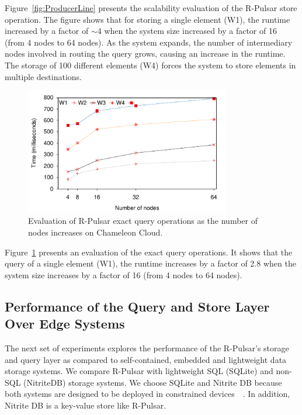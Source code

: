 Figure~\ref{fig:ProducerLine} presents the scalability evaluation of the R-Pulsar store operation. The figure shows that for storing a single element (W1), the runtime increased by a factor of $\sim$4 when the system size increased by a factor of 16 (from 4 nodes to 64 nodes). As the system expands, the number of intermediary nodes involved in routing the query grows, causing an increase in the runtime. The storage of 100 different elements (W4) forces the system to store elements in multiple destinations.

\begin{figure}[h!]
  \centering
  \includegraphics[width=0.8\textwidth]{Results/ProducerLineEx.pdf}
  \caption{Evaluation of R-Pulsar exact query operations as the number of nodes increases on Chameleon Cloud.}
  \label{fig:ProducerLineEx}
\end{figure}

Figure~\ref{fig:ProducerLineEx} presents an evaluation of the exact query operations. It shows that the query of a single element (W1), the runtime increases by a factor of 2.8 when the system size increases by a factor of 16 (from 4 nodes to 64 nodes).

\subsection{Performance of the Query and Store Layer Over Edge Systems}

The next set of experiments explores the performance of the R-Pulsar's storage and query layer as compared to self-contained, embedded and lightweight data storage systems. We compare R-Pulsar with lightweight SQL (SQLite) and non-SQL (NitriteDB) storage systems. We choose SQLite and Nitrite DB because  both systems are designed to be deployed in constrained devices~\cite{sqlite}~\cite{nitrite}. In addition, Nitrite DB is a key-value store like R-Pulsar. 


